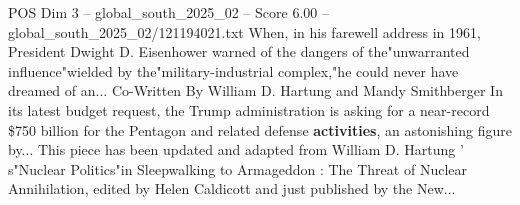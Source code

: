 \begin{textsample}{POS Dim 3 – global\_south\_2025\_02 – Score 6.00 – global\_south\_2025\_02/121194021.txt}
When, in his farewell address in 1961, President Dwight D.
Eisenhower warned of the dangers of the"unwarranted influence"wielded by the"military-industrial complex,"he could never have dreamed of an...
Co-Written By William D.
Hartung and Mandy Smithberger In its latest budget request, the Trump administration is asking for a near-record \$750 billion for the Pentagon and related defense \textbf{activities}, an astonishing figure by...
This piece has been updated and adapted from William D.
Hartung ' s"Nuclear Politics"in Sleepwalking to Armageddon : The Threat of Nuclear Annihilation, edited by Helen Caldicott and just published by the New...

\end{textsample}
